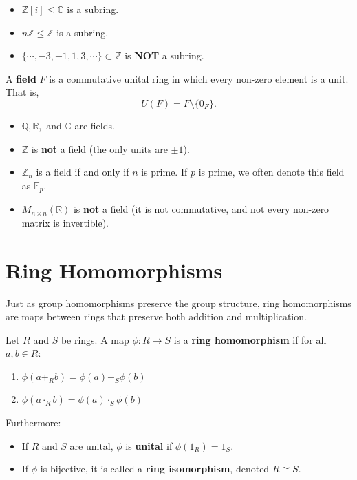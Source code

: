 \begin{example}
\begin{itemize}
    \item $\mathbb{Z}[i]\leq \mathbb{C}$ is a subring.
    \item $n\mathbb{Z}\leq \mathbb{Z}$ is a subring.
    \item $\{\cdots,-3,-1,1,3,\cdots\}\subset\mathbb{Z}$ is \textbf{NOT} a subring.
\end{itemize}
\end{example}


\begin{definition}[Field]
A \textbf{field} $F$ is a commutative unital ring in which every non-zero element is a unit. That is, 
$$U(F) = F \setminus \{0_{F}\}.$$
\end{definition}

\begin{example}
\begin{itemize}
    \item $\mathbb{Q}, \mathbb{R},$ and $\mathbb{C}$ are fields.
    \item $\mathbb{Z}$ is \textbf{not} a field (the only units are $\pm 1$).
    \item $\mathbb{Z}_n$ is a field if and only if $n$ is prime. If $p$ is prime, we often denote this field as $\mathbb{F}_p$.
    \item $M_{n \times n}(\mathbb{R})$ is \textbf{not} a field (it is not commutative, and not every non-zero matrix is invertible).
\end{itemize}
\end{example}


\section{Ring Homomorphisms}
Just as group homomorphisms preserve the group structure, ring homomorphisms are maps between rings that preserve both addition and multiplication.
\begin{definition}
Let $R$ and $S$ be rings. A map $\phi: R \to S$ is a \textbf{ring homomorphism} if for all $a, b \in R$:
\begin{enumerate}
    \item $\phi(a +_R b) = \phi(a) +_S \phi(b)$
    \item $\phi(a \cdot_R b) = \phi(a) \cdot_S \phi(b)$
\end{enumerate}
Furthermore:
\begin{itemize}
    \item If $R$ and $S$ are unital, $\phi$ is \textbf{unital} if $\phi(1_R) = 1_S$.
    \item If $\phi$ is bijective, it is called a \textbf{ring isomorphism}, denoted $R \cong S$.
\end{itemize}
\end{definition}

